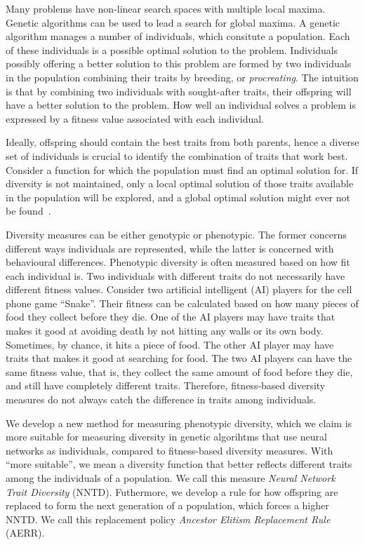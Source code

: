 Many problems have non-linear search spaces with multiple local maxima. Genetic algorithms can be used to lead a search for global maxima. A genetic algorithm manages a number of individuals, which consitute a population. Each of these individuals is a possible optimal solution to the problem. Individuals possibly offering a better solution to this problem are formed by two individuals in the population combining their traits by breeding, or \emph{procreating}. The intuition is that by combining two individuals with sought-after traits, their offspring will have a better solution to the problem. How well an individual solves a problem is expressed by a fitness value associated with each individual.

Ideally, offspring should contain the best traits from both parents, hence a diverse set of individuals is crucial to identify the combination of traits that work best. Consider a function for which the population must find an optimal solution for. If diversity is not maintained, only a local optimal solution of those traits available in the population will be explored, and a global optimal solution might ever not be found~\cite{ursem2002diversity}.

Diversity measures can be either genotypic or phenotypic. The former concerns different ways individuals are represented, while the latter is concerned with behavioural differences. Phenotypic diversity is often measured based on how fit each individual is. Two individuals with different traits do not necessarily have different fitness values. Consider two artificial intelligent (AI) players for the cell phone game ``Snake''. Their fitness can be calculated based on how many pieces of food they collect before they die. One of the AI players may have traits that makes it good at avoiding death by not hitting any walls or its own body. Sometimes, by chance, it hits a piece of food. The other AI player may have traits that makes it good at searching for food. The two AI players can have the same fitness value, that is, they collect the same amount of food before they die, and still have completely different traits. Therefore, fitness-based diversity measures do not always catch the difference in traits among individuals.

We develop a new method for measuring phenotypic diversity, which we claim is more suitable for measuring diversity in genetic algorihtms that use neural networks as individuals, compared to fitness-based diversity measures. With ``more suitable'', we mean a diversity function that better reflects different traits among the individuals of a population. We call this measure \emph{Neural Network Trait Diversity} (NNTD). Futhermore, we develop a rule for how offspring are replaced to form the next generation of a population, which forces a higher NNTD\@. We call this replacement policy \emph{Ancestor Elitism Replacement Rule} (AERR).

